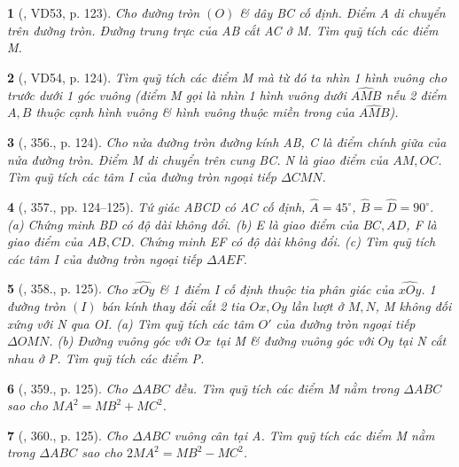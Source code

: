 \documentclass{article}
\newtheorem{baitoan}{}
\begin{document}
\begin{baitoan}[\cite{Binh_Toan_9_tap_2}, VD53, p. 123]
	Cho đường tròn $(O)$ \& dây BC cố định. Điểm A di chuyển trên đường tròn. Đường trung trực của AB cắt AC ở M. Tìm quỹ tích các điểm M.
\end{baitoan}

\begin{baitoan}[\cite{Binh_Toan_9_tap_2}, VD54, p. 124]
	Tìm quỹ tích các điểm M mà từ đó ta nhìn 1 hình vuông cho trước dưới 1 góc vuông (điểm M gọi là {\rm nhìn 1 hình vuông dưới $\widehat{AMB}$} nếu 2 điểm $A,B$ thuộc cạnh hình vuông \& hình vuông thuộc miền trong của $\widehat{AMB}$).
\end{baitoan}

\begin{baitoan}[\cite{Binh_Toan_9_tap_2}, 356., p. 124]
	Cho nửa đường tròn đường kính AB, C là điểm chính giữa của nửa đường tròn. Điểm M di chuyển trên cung BC. N là giao điểm của $AM,OC$. Tìm quỹ tích các tâm I của đường tròn ngoại tiếp $\Delta CMN$.
\end{baitoan}

\begin{baitoan}[\cite{Binh_Toan_9_tap_2}, 357., pp. 124--125]
	Tứ giác ABCD có AC cố định, $\widehat{A} = 45^\circ$, $\widehat{B} = \widehat{D} = 90^\circ$. (a) Chứng minh BD có độ dài không đổi. (b) E là giao điểm của $BC,AD$, F là giao điểm của $AB,CD$. Chứng minh EF có độ dài không đổi. (c) Tìm quỹ tích các tâm I của đường tròn ngoại tiếp $\Delta AEF$.
\end{baitoan}

\begin{baitoan}[\cite{Binh_Toan_9_tap_2}, 358., p. 125]
	Cho $\widehat{xOy}$ \& 1 điểm I cố định thuộc tia phân giác của $\widehat{xOy}$. 1 đường tròn $(I)$ bán kính thay đổi cắt 2 tia $Ox,Oy$ lần lượt ở $M,N$, M không đối xứng với N qua OI. (a) Tìm quỹ tích các tâm $O'$ của đường tròn ngoại tiếp $\Delta OMN$. (b) Đường vuông góc với $Ox$ tại M \& đường vuông góc với $Oy$ tại N cắt nhau ở P. Tìm quỹ tích các điểm P.
\end{baitoan}

\begin{baitoan}[\cite{Binh_Toan_9_tap_2}, 359., p. 125]
	Cho $\Delta ABC$ đều. Tìm quỹ tích các điểm M nằm trong $\Delta ABC$ sao cho $MA^2 = MB^2 + MC^2$.
\end{baitoan}

\begin{baitoan}[\cite{Binh_Toan_9_tap_2}, 360., p. 125]
	Cho $\Delta ABC$ vuông cân tại A. Tìm quỹ tích các điểm M nằm trong $\Delta ABC$ sao cho $2MA^2 = MB^2 - MC^2$.
\end{baitoan}
\end{document}
